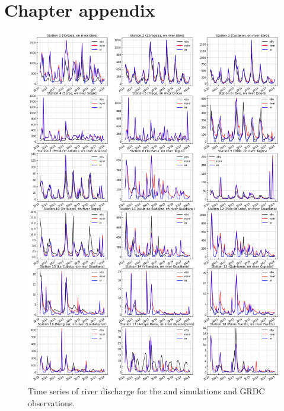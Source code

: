 \clearpage

\section{Chapter appendix} %
\begin{figure}[htbp]
    \centering
    \includegraphics[width=\textwidth]{images/chap4/article/18_stations_TS.png}
    \caption{Time series of river discharge for the \irr and \noirr simulations and GRDC observations.}
\end{figure}

